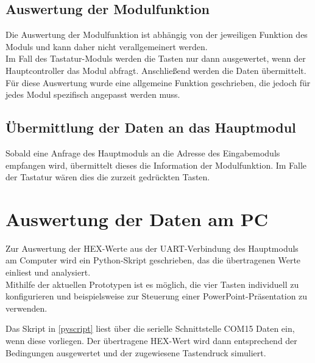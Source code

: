


\subsection{Auswertung der Modulfunktion}
Die Auswertung der Modulfunktion ist abhängig von der jeweiligen Funktion des Moduls und kann daher nicht verallgemeinert werden.\\
Im Fall des Tastatur-Moduls werden die Tasten nur dann ausgewertet, wenn der Hauptcontroller das Modul abfragt. Anschließend werden die Daten übermittelt. Für diese Auswertung wurde eine allgemeine Funktion geschrieben, die jedoch für jedes Modul spezifisch angepasst werden muss.\\



\subsection{Übermittlung der Daten an das Hauptmodul}
Sobald eine Anfrage des Hauptmoduls an die Adresse des Eingabemoduls empfangen wird, übermittelt dieses die Information der Modulfunktion. Im Falle der Tastatur wären dies die zurzeit gedrückten Tasten.


\section{Auswertung der Daten am PC}
Zur Auswertung der HEX-Werte aus der UART-Verbindung des Hauptmoduls am Computer
wird ein Python-Skript geschrieben, das die übertragenen Werte einliest und analysiert. \\

Mithilfe der aktuellen Prototypen ist es möglich, die vier Tasten individuell zu konfigurieren
und beispielsweise zur Steuerung einer PowerPoint-Präsentation zu verwenden.

Das Skript in \ref{pyscript} liest über die serielle Schnittstelle \glqq COM15\grqq{} Daten ein, wenn diese vorliegen. Der übertragene HEX-Wert wird dann entsprechend der Bedingungen ausgewertet und der zugewiesene Tastendruck simuliert. 

